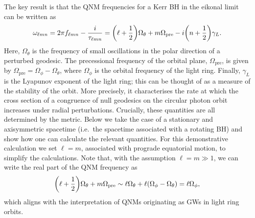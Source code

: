 The key result is that the QNM frequencies for a Kerr BH in the eikonal limit can be written as
\begin{equation}\label{ch1:eq:eikonalomega}
    \omega_{\ell m n} = 2\pi f_{\ell m n} - \frac{i}{\tau_{\ell m n}} = \qty(\ell + \frac{1}{2}) \Omega_\theta + m \Omega_\mathrm{pre} - i \qty(n + \frac{1}{2}) \gamma_L.
\end{equation}
Here, $\Omega_\theta$ is the frequency of small oscillations in the polar direction of a perturbed geodesic. 
The precessional frequency of the orbital plane, $\Omega_\mathrm{pre}$, is given by $\Omega_\mathrm{pre} = \Omega_\phi - \Omega_\theta$, where $\Omega_\phi$ is the orbital frequency of the light ring.
Finally, $\gamma_L$ is the Lyapunov exponent of the light ring; this can be thought of as a measure of the stability of the orbit.
More precisely, it characterises the rate at which the cross section of a congruence of null geodesics on the circular photon orbit increases under radial perturbations.
Crucially, these quantities are all determined by the metric. 
Below we take the case of a stationary and axisymmetric spacetime (i.e.\ the spacetime associated with a rotating BH) and show how one can calculate the relevant quantities.
For this demonstrative calculation we set $\ell = m$, associated with prograde equatorial motion, to simplify the calculations.
Note that, with the assumption $\ell = m \gg 1$, we can write the real part of the QNM frequency as
\begin{equation}
    \qty(\ell + \frac{1}{2}) \Omega_\theta + m \Omega_\mathrm{pre} \sim \ell \Omega_\theta + \ell \qty(\Omega_\phi - \Omega_\theta) = \ell \Omega_\phi,
\end{equation}
which aligns with the interpretation of QNMs originating as GWs in light ring orbits.

